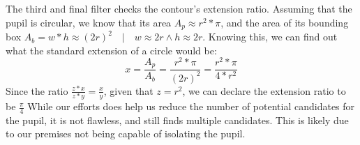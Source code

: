 \newline
The third and final filter checks the contour's extension ratio. Assuming that the pupil is circular, we know that its area \(A_p \approx r^2*\pi\), and the area of its bounding box \(A_b = w*h \approx (2r)^2 \quad | \quad w \approx 2r \wedge h \approx 2r\). Knowing this, we can find out what the standard extension of a circle would be:
\[x = \frac{A_p}{A_b} = \frac{r^2*\pi}{(2r)^2} = \frac{r^2*\pi}{4*r^2}\]
Since the ratio \(\frac{z*x}{z*y} = \frac{x}{y}\), given that \(z = r^2\), we can declare the extension ratio to be \(\frac{\pi}{4}\)
\newline
\newline
While our efforts does help us reduce the number of potential candidates for the pupil, it is not flawless, and still finds multiple candidates. This is likely due to our premises not being capable of isolating the pupil.